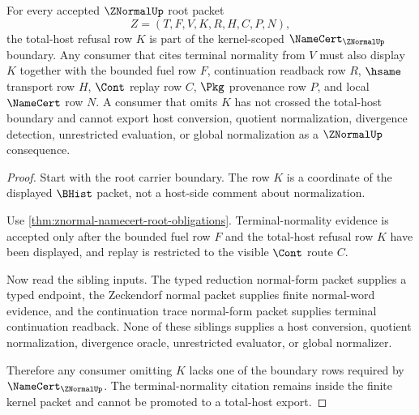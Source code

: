 \begin{theorem}
\label{thm:znormal-total-host-refusal-boundary}
For every accepted $\ZNormalUp$ root packet
$$
Z=(T,F,V,K,R,H,C,P,N),
$$
the total-host refusal row $K$ is part of the kernel-scoped $\NameCert_{\ZNormalUp}$ boundary. Any consumer that cites terminal normality from $V$ must also display $K$ together with the bounded fuel row $F$, continuation readback row $R$, $\hsame$ transport row $H$, $\Cont$ replay row $C$, $\Pkg$ provenance row $P$, and local $\NameCert$ row $N$. A consumer that omits $K$ has not crossed the total-host boundary and cannot export host conversion, quotient normalization, divergence detection, unrestricted evaluation, or global normalization as a $\ZNormalUp$ consequence.
\end{theorem}
\begin{proof}
Start with the root carrier boundary. The row $K$ is a coordinate of the displayed $\BHist$ packet, not a host-side comment about normalization.

Use \autoref{thm:znormal-namecert-root-obligations}. Terminal-normality evidence is accepted only after the bounded fuel row $F$ and the total-host refusal row $K$ have been displayed, and replay is restricted to the visible $\Cont$ route $C$.

Now read the sibling inputs. The typed reduction normal-form packet supplies a typed endpoint, the Zeckendorf normal packet supplies finite normal-word evidence, and the continuation trace normal-form packet supplies terminal continuation readback. None of these siblings supplies a host conversion, quotient normalization, divergence oracle, unrestricted evaluator, or global normalizer.

Therefore any consumer omitting $K$ lacks one of the boundary rows required by $\NameCert_{\ZNormalUp}$. The terminal-normality citation remains inside the finite kernel packet and cannot be promoted to a total-host export.
\end{proof}

